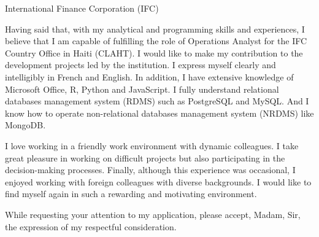 \documentclass[12pt]{lettre}
\begin{document}
\begin{letter}{
International Finance Corporation (IFC)
}
\begin{spacing}{1.5}
Having said that, with my analytical and programming skills and 
experiences, I believe that I am capable of fulfilling the 
role of Operations Analyst for the IFC Country Office in Haiti (CLAHT). 
I would like to make my contribution to the development 
projects led by the institution. I express myself clearly and 
intelligibly in French and English. In addition, I have 
extensive knowledge of Microsoft Office, R, Python and 
JavaScript. I fully understand relational databases management
 system 
(RDMS) such as PostgreSQL and MySQL. And I know how to operate 
non-relational databases management system (NRDMS) like MongoDB.

I love working in a friendly work environment with dynamic 
colleagues. I take great pleasure in working on difficult 
projects but also participating in the decision-making processes. 
Finally, although this experience was occasional, I enjoyed 
working with foreign colleagues with diverse backgrounds. I 
would like to find myself again in such a rewarding and 
motivating environment.

\end{spacing}

\closing{
    While requesting your attention to my application, please 
    accept, Madam, Sir, the expression of my respectful 
    consideration.}
\end{letter}
\end{document}
